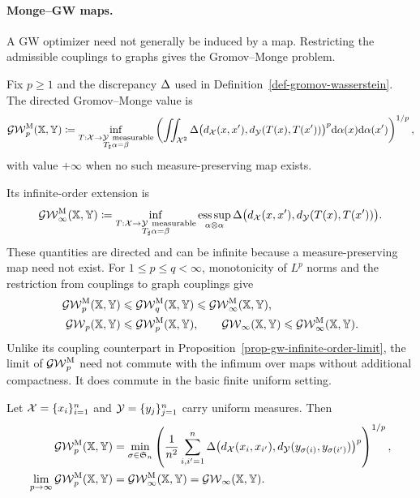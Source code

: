 \paragraph{Monge--GW maps.}
A GW optimizer need not generally be induced by a map. Restricting the admissible couplings to graphs gives the Gromov--Monge problem.
\begin{defn}\label{def-gromov-monge}
	Fix $p\geq1$ and the discrepancy $\Delta$ used in Definition~\ref{def-gromov-wasserstein}. The directed Gromov--Monge value is
	\begin{equation}\label{eq-gromov-monge-p}
		\GW_p^{\mathrm M}(\XX,\YY)
		\eqdef
		\inf_{\substack{T:\X\to\Y\ \mathrm{measurable}\\T_\sharp\alpha=\beta}}
		\left(
			\iint_{\X^2}
			\De\bigl(\dist_\X(x,x'),\dist_\Y(T(x),T(x'))\bigr)^p
			\d\alpha(x)\d\alpha(x')
		\right)^{1/p},
	\end{equation}
	with value $+\infty$ when no such measure-preserving map exists.
\end{defn}
Its infinite-order extension is
\begin{equation}\label{eq-gromov-monge-infinity}
	\GW_\infty^{\mathrm M}(\XX,\YY)
	\eqdef
	\inf_{\substack{T:\X\to\Y\ \mathrm{measurable}\\T_\sharp\alpha=\beta}}
	\operatorname*{ess\,sup}_{\alpha\otimes\alpha}
	\De\bigl(\dist_\X(x,x'),\dist_\Y(T(x),T(x'))\bigr).
\end{equation}
These quantities are directed and can be infinite because a measure-preserving map need not exist. For $1\leq p\leq q<\infty$, monotonicity of $L^p$ norms and the restriction from couplings to graph couplings give
\begin{equation}\label{eq-gromov-monge-basic-comparisons}
	\begin{aligned}
		\operatorname{\mathcal{GW}}_p^{\mathrm M}(\mathbb{X},\mathbb{Y})
		&\leqslant
		\operatorname{\mathcal{GW}}_q^{\mathrm M}(\mathbb{X},\mathbb{Y})
		\leqslant
		\operatorname{\mathcal{GW}}_\infty^{\mathrm M}(\mathbb{X},\mathbb{Y}),\\
		\operatorname{\mathcal{GW}}_p(\mathbb{X},\mathbb{Y})
		&\leqslant
		\operatorname{\mathcal{GW}}_p^{\mathrm M}(\mathbb{X},\mathbb{Y}),
		\qquad
		\operatorname{\mathcal{GW}}_\infty(\mathbb{X},\mathbb{Y})\leqslant\operatorname{\mathcal{GW}}_\infty^{\mathrm M}(\mathbb{X},\mathbb{Y}).
	\end{aligned}
\end{equation}
Unlike its coupling counterpart in Proposition~\ref{prop-gw-infinite-order-limit}, the limit of $\operatorname{\mathcal{GW}}_p^{\mathrm M}$ need not commute with the infimum over maps without additional compactness. It does commute in the basic finite uniform setting.
\begin{prop}\label{prop-finite-uniform-gromov-monge-limit}
	Let $\mathcal{X}=\{x_i\}_{i=1}^n$ and $\mathcal{Y}=\{y_j\}_{j=1}^n$ carry uniform measures. Then
	\begin{align}
		\operatorname{\mathcal{GW}}_p^{\mathrm M}(\mathbb{X},\mathbb{Y})
		&=
		\min_{\sigma\in\mathfrak S_n}
		\left(
			\frac1{n^2}\sum_{i,i'=1}^n
			\Delta\bigl(d_{\mathcal{X}}(x_i,x_{i'}),d_{\mathcal{Y}}(y_{\sigma(i)},y_{\sigma(i')})\bigr)^p
		\right)^{1/p},
		\label{eq-finite-gromov-monge-p}\\
		\lim_{p\to\infty}\operatorname{\mathcal{GW}}_p^{\mathrm M}(\mathbb{X},\mathbb{Y})
		&=
		\operatorname{\mathcal{GW}}_\infty^{\mathrm M}(\mathbb{X},\mathbb{Y})
		=
		\operatorname{\mathcal{GW}}_\infty(\mathbb{X},\mathbb{Y}).
		\label{eq-finite-gw-gm-infinity-limit}
	\end{align}
\end{prop}
